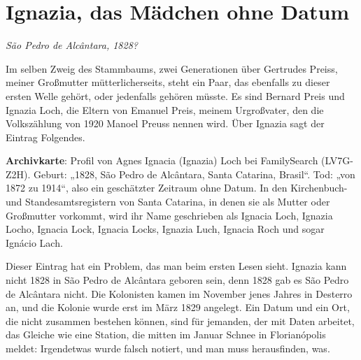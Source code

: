 \documentclass[
  ngerman,
  11pt,
  openany]{book}
\begin{document}
\section{Ignazia, das Mädchen ohne
Datum}\label{ignazia-das-muxe4dchen-ohne-datum}

\emph{São Pedro de Alcântara, 1828?}

Im selben Zweig des Stammbaums, zwei Generationen über Gertrudes Preiss,
meiner Großmutter mütterlicherseits, steht ein Paar, das ebenfalls zu
dieser ersten Welle gehört, oder jedenfalls gehören müsste. Es sind
Bernard Preis und Ignazia Loch, die Eltern von Emanuel Preis, meinem
Urgroßvater, den die Volkszählung von 1920 Manoel Preuss nennen wird.
Über Ignazia sagt der Eintrag Folgendes.

\begin{ficha}

\textbf{Archivkarte}: Profil von Agnes Ignacia (Ignazia) Loch bei
FamilySearch (LV7G-Z2H). Geburt: „1828, São Pedro de Alcântara, Santa
Catarina, Brasil``. Tod: „von 1872 zu 1914``, also ein geschätzter
Zeitraum ohne Datum. In den Kirchenbuch- und Standesamtsregistern von
Santa Catarina, in denen sie als Mutter oder Großmutter vorkommt, wird
ihr Name geschrieben als Ignacia Loch, Ignazia Locho, Ignacia Lock,
Ignacia Locks, Ignazia Luch, Ignacia Roch und sogar Ignácio Lach.

\end{ficha}

Dieser Eintrag hat ein Problem, das man beim ersten Lesen sieht. Ignazia
kann nicht 1828 in São Pedro de Alcântara geboren sein, denn 1828 gab es
São Pedro de Alcântara nicht. Die Kolonisten kamen im November jenes
Jahres in Desterro an, und die Kolonie wurde erst im März 1829 angelegt.
Ein Datum und ein Ort, die nicht zusammen bestehen können, sind für
jemanden, der mit Daten arbeitet, das Gleiche wie eine Station, die
mitten im Januar Schnee in Florianópolis meldet: Irgendetwas wurde
falsch notiert, und man muss herausfinden, was.
\end{document}
